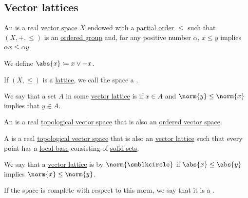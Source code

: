 \subsection{Vector lattices}\label{subsec:vector_lattices}

\begin{definition}\label{def:ordered_vector_space}
  An  is a real \hyperref[def:vector_space]{vector space} \( X \) endowed with a \hyperref[def:partially_ordered_set]{partial order} \( \leq \) such that \( (X, +, \leq) \) is an \hyperref[def:ordered_magma]{ordered group} and, for any positive number \( \alpha \), \( x \leq y \) implies \( \alpha x \leq \alpha y \).

  We define \( \abs{x} \coloneqq x \vee -x \).

  If \( (X, \leq) \) is a \hyperref[def:semilattice/lattice]{lattice}, we call the space a .
\end{definition}

\begin{definition}\label{def:solid_set}
  We say that a set \( A \) in some \hyperref[def:ordered_vector_space]{vector lattice} is  if \( x \in A \) and \( \norm{y} \leq \norm{x} \) implies that \( y \in A \).
\end{definition}

\begin{definition}\label{def:ordered_topological_vector_space}
  An  is a real \hyperref[def:topological_vector_space]{topological vector space} that is also an \hyperref[def:ordered_vector_space]{ordered vector space}.
\end{definition}

\begin{definition}\label{def:topological_vector_lattice}
  A  is a real \hyperref[def:topological_vector_space]{topological vector space} that is also an \hyperref[def:ordered_vector_space]{vector lattice} such that every point has a \hyperref[def:topological_local_base]{local base} consisting of \hyperref[def:solid_set]{solid sets}.
\end{definition}

\begin{definition}\label{def:normed_vector_lattice}
  We say that a \hyperref[def:ordered_vector_space]{vector lattice} is  by \( \norm{\anon} \) if \( \abs{x} \leq \abs{y} \) implies \( \norm{x} \leq \norm{y} \).

  If the space is complete with respect to this norm, we say that it is a .
\end{definition}
